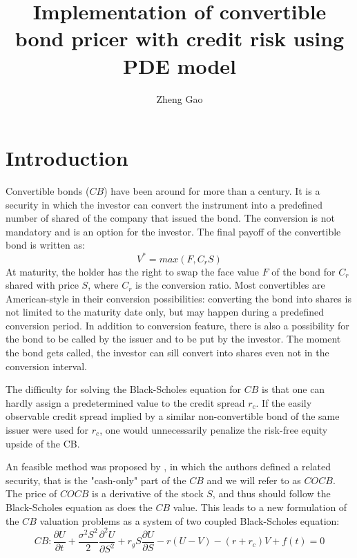 \documentclass[12pt]{article}
\begin{document}
\title{Implementation of convertible bond pricer with credit risk using PDE model}
\author{Zheng Gao}
\maketitle

\section{Introduction}
Convertible bonds ($CB$) have been around for more than a century. It is a security in which the investor can convert the instrument into a predefined number of shared of the company that issued the bond. The conversion is not mandatory and is an option for the investor. The final payoff of the convertible bond is written as:
\begin{equation}
V^* = max(F, C_rS)
\end{equation}
At maturity, the holder has the right to swap the face value $F$ of the bond for
 $C_r$ shared with price $S$, where $C_r$ is the conversion ratio. Most convertibles are American-style in their conversion possibilities: converting the bond into shares is not limited to the maturity date only, but may happen during a predefined conversion period. In addition to conversion feature, there is also a possibility for the bond to be called by the issuer and to be put by the investor. The moment the bond gets called, the investor can sill convert into shares even not in the conversion interval. 

The difficulty for solving the Black-Scholes equation for $CB$ is that one can hardly assign a predetermined value to the credit spread $r_c$. If the easily observable credit spread implied by a similar non-convertible bond of the same issuer were used for $r_c$, one would unnecessarily penalize the risk-free equity upside of the CB.

An feasible method was proposed by \cite{Tsiveriotis1998}, in which the authors defined a related security, that is the "cash-only" part of the $CB$ and we will refer to as $COCB$. The price of $COCB$ is a derivative of the stock $S$, and thus should follow the Black-Scholes equation as does the $CB$ value. This leads to a new formulation of the $CB$ valuation problems as a system of two coupled Black-Scholes equation:
\begin{equation}
CB: \frac{\partial{U}}{\partial{t}} + 
\frac{\sigma^2S^2}{2}\frac{\partial^2{U}}{\partial{S}^2} + r_gS\frac{\partial{U}}{\partial{S}} - r(U-V) - (r+r_c)V + f(t) = 0 
\label{eq:CB}
\end{equation}
\end{document}
